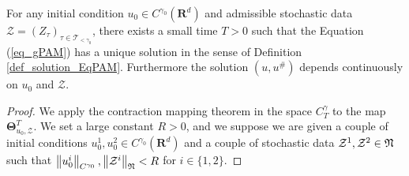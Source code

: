 \documentclass[11pt]{preprint}
\newcommand{\mcZ}{\mathcal{Z}}
\newcommand{\mcT}{\mathcal{T}}
\newcounter{theorem}
\def\eqref#1{(\ref{#1})}
\newcommand{\bfR}{\mathbf{R}}
\newcommand{\norme}[1]{\left\lVert #1 \right\lVert}
\begin{document}
		
		\begin{proposition} \label{fixed_point_prop}
			For any initial condition $u_0 \in  C^{\gamma_0}(\bfR^d)$ and admissible stochastic data $\mcZ=(Z_\tau)_{\tau\in\mcT_{<\gamma_0}}$, there exists a small time $T>0$ such that the Equation \eqref{eq_gPAM} has a unique solution in the sense of Definition \ref{def_solution_EqPAM}. Furthermore the solution $(u,u^\#)$ depends continuously on $u_0$ and $\mcZ$.
		\end{proposition}
		
		\begin{proof}
			We apply the contraction mapping theorem in the space $C^\gamma_T$ to the map $\boldsymbol{\Theta}_{u_0,\mcZ}^T$.
		We set a large constant $R>0$, and we suppose we are given a couple of initial conditions $u_0^1,u_0^2\in C^{\gamma_0}(\bfR^d)$ and a couple of stochastic data $\mcZ^1,\mcZ^2\in\frak{N}$ such that $\norme{u_0^i}_{C^{\gamma_0}},\norme{\mcZ^i}_{\frak N}< R$ for $i\in\{1,2\}$.
			
			
			

\end{proof}
\end{document}
